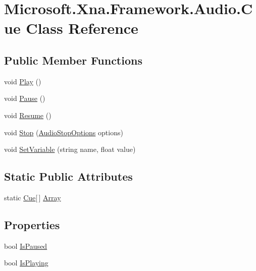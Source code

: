 \hypertarget{class_microsoft_1_1_xna_1_1_framework_1_1_audio_1_1_cue}{}\section{Microsoft.\+Xna.\+Framework.\+Audio.\+Cue Class Reference}
\label{class_microsoft_1_1_xna_1_1_framework_1_1_audio_1_1_cue}
\subsection*{Public Member Functions}
\begin{DoxyCompactItemize}
\item 
void \hyperlink{class_microsoft_1_1_xna_1_1_framework_1_1_audio_1_1_cue_a6501c1aac9057e1adbbe338073f7a0ce}{Play} ()
\item 
void \hyperlink{class_microsoft_1_1_xna_1_1_framework_1_1_audio_1_1_cue_a90bbbd712b4d97ff4b8c1346ab36e441}{Pause} ()
\item 
void \hyperlink{class_microsoft_1_1_xna_1_1_framework_1_1_audio_1_1_cue_a422851e01e81b1a333dbc4b373963ab5}{Resume} ()
\item 
void \hyperlink{class_microsoft_1_1_xna_1_1_framework_1_1_audio_1_1_cue_a41995c27bbfacdd5d6664c9770895068}{Stop} (\hyperlink{namespace_microsoft_1_1_xna_1_1_framework_1_1_audio_ad6af2191f499fbe4c44d4f8ae2a0209b}{Audio\+Stop\+Options} options)
\item 
void \hyperlink{class_microsoft_1_1_xna_1_1_framework_1_1_audio_1_1_cue_a8bf17034acc6e8ac92bf6c056fb5c202}{Set\+Variable} (string name, float value)
\end{DoxyCompactItemize}
\subsection*{Static Public Attributes}
\begin{DoxyCompactItemize}
\item 
static \hyperlink{class_microsoft_1_1_xna_1_1_framework_1_1_audio_1_1_cue}{Cue}\mbox{[}$\,$\mbox{]} \hyperlink{class_microsoft_1_1_xna_1_1_framework_1_1_audio_1_1_cue_a9b5ad6f870d59de9a80e7f95769f69fb}{Array}
\end{DoxyCompactItemize}
\subsection*{Properties}
\begin{DoxyCompactItemize}
\item 
bool \hyperlink{class_microsoft_1_1_xna_1_1_framework_1_1_audio_1_1_cue_ac93058cebd8f71c1e313a46470306575}{Is\+Paused}
\item 
bool \hyperlink{class_microsoft_1_1_xna_1_1_framework_1_1_audio_1_1_cue_a53f721e55dd582f554baf2fc06f00f43}{Is\+Playing}
\end{DoxyCompactItemize}


